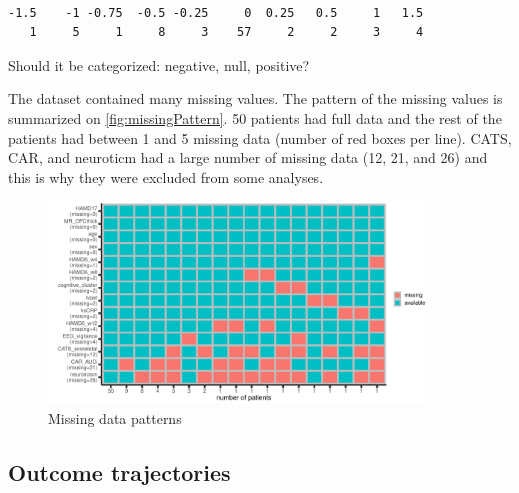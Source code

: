 \documentclass[12pt]{article}
\begin{document}
\begin{verbatim}

-1.5    -1 -0.75  -0.5 -0.25     0  0.25   0.5     1   1.5 
   1     5     1     8     3    57     2     2     3     4
\end{verbatim}


Should it be categorized: negative, null, positive?

\vfill

The dataset contained many missing values. The pattern of the missing
values is summarized on \autoref{fig:missingPattern}. 50 patients had
full data and the rest of the patients had between 1 and 5 missing
data (number of red boxes per line). CATS, CAR, and neuroticm had a
large number of missing data (12, 21, and 26) and this is why they
were excluded from some analyses.

\clearpage

\begin{figure}[!h]
\centering
\includegraphics[trim={0 0 0 0},width=0.9\textwidth]{./../figures/gg-missingPattern.pdf}
\caption{\label{fig:missingPattern}Missing data patterns}
\end{figure}

\bigskip

\subsection{Outcome trajectories}
\label{sec:org8822473}
\end{document}

